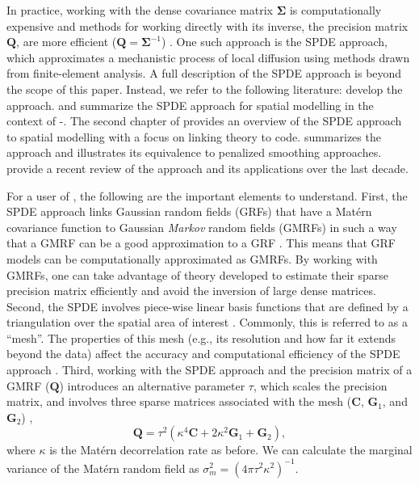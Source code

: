 \documentclass[article]{jss}\usepackage[]{graphicx}\usepackage[dvipsnames]{xcolor}
\newcommand{\sdmTMB}{\pkg{sdmTMB}}
\newcommand{\INLA}{\proglang{R}-\pkg{INLA}}
\begin{document}
In practice, working with the dense covariance matrix $\bm{\Sigma}$ is computationally expensive
and methods for working directly with its inverse, the precision matrix $\bm{Q}$, are more efficient ($\bm{Q} = \bm{\Sigma}^{-1}$) \citep{rue2005gmrf,simpson2012}.
One such approach is the SPDE approach, which approximates a mechanistic process of local diffusion using methods drawn from finite-element analysis.
A full description of the SPDE approach is beyond the scope of this paper.
Instead, we refer to the following literature:
\citet{lindgren2011} develop the approach.
\citet{lindgren2015} and \cite{bakka2018review} summarize the SPDE approach for spatial modelling in the context of \INLA.
The second chapter of \citet{krainski2018} provides an overview of the SPDE approach to spatial modelling with a focus on linking theory to code.
\citet{miller2019} summarizes the approach and illustrates its equivalence to penalized smoothing approaches.
\citet{lindgren2022ten} provide a recent review of the approach and its applications over the last decade.

For a user of \sdmTMB, the following are the important elements to understand.
First, the SPDE approach links Gaussian random fields (GRFs) that have a Mat\'ern covariance function to Gaussian \emph{Markov} random fields (GMRFs) in such a way that a GMRF can be a good approximation to a GRF \citep{lindgren2011}.
This means that GRF models can be computationally approximated as GMRFs.
By working with GMRFs, one can take advantage of theory developed to estimate their sparse precision matrix efficiently \citep{rue2005gmrf, lindgren2011} and avoid the inversion of large dense matrices.
Second, the SPDE involves piece-wise linear basis functions that are defined by a triangulation over the spatial area of interest \citep{lindgren2011}.
Commonly, this is referred to as a ``mesh''.
The properties of this mesh (e.g., its resolution and how far it extends beyond the data) affect the accuracy and computational efficiency of the SPDE approach \citep{lindgren2011}.
Third, working with the SPDE approach and the precision matrix of a GMRF ($\bm{Q}$) introduces an alternative parameter $\tau$, which scales the precision matrix, and involves three sparse matrices associated with the mesh ($\bm{C}$, $\bm{G}_1$, and $\bm{G}_2$) \citep{lindgren2011},
\[
\bm{Q} = \tau^2 \left(\kappa^4\bm{C} + 2\kappa^2\bm{G}_1 + \bm{G}_2 \right),
\]
where $\kappa$ is the Mat\'ern decorrelation rate as before.
We can calculate the marginal variance of the Mat\'ern random field as $\sigma_m^2 = \left (4 \pi \tau^2 \kappa^2 \right)^{-1}$.
\end{document}
